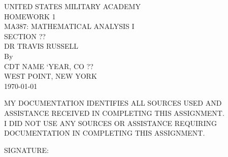 \documentclass{article}
\begin{document}
	
\begin{titlepage}
	\clearpage\thispagestyle{empty}
	\begin{centering}
		\vspace*{0.5in}
		UNITED STATES MILITARY ACADEMY \\
		\vspace{1in}
		HOMEWORK 1 \\
		\vspace{1in}
		MA387: MATHEMATICAL ANALYSIS I \\
		\vspace{0.15in}
		SECTION ?? \\
		\vspace{0.15in}
		DR TRAVIS RUSSELL \\
		\vspace{1in}
		By \\  \vspace{0.15in}
		CDT NAME `YEAR, CO ?? \\ \vspace{0.15in}
		WEST POINT, NEW YORK \\ \vspace{0.15in}
		\MakeUppercase{\today} \\
		\vspace{1in}
	\end{centering}
	\noindent
	\underline{\hspace{0.5in}} MY DOCUMENTATION IDENTIFIES ALL SOURCES USED AND ASSISTANCE RECEIVED IN COMPLETING THIS ASSIGNMENT. \\
	
	\noindent
	\underline{\hspace{0.5in}} I DID NOT USE ANY SOURCES OR ASSISTANCE REQUIRING DOCUMENTATION IN COMPLETING THIS ASSIGNMENT. \\ \vspace{0.5in}
	
	\noindent
	SIGNATURE: \underline{\hspace{5in}}
\end{titlepage}	
	
\end{document}
